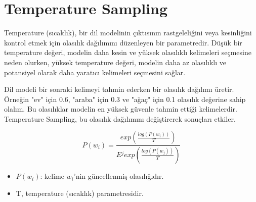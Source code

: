 \section{Temperature Sampling}

Temperature (sıcaklık), bir dil modelinin çıktısının rastgeleliğini veya kesinliğini kontrol etmek için olasılık dağılımını düzenleyen bir parametredir. Düşük bir temperature değeri, modelin daha kesin ve yüksek olasılıklı kelimeleri seçmesine neden olurken, yüksek temperature değeri, modelin daha az olasılıklı ve potansiyel olarak daha yaratıcı kelimeleri seçmesini sağlar. 

Dil modeli bir sonraki kelimeyi tahmin ederken bir olasılık dağılımı üretir. Örneğin "ev" için 0.6, "araba" için 0.3 ve "ağaç" için 0.1 olasılık değerine sahip olalım. Bu olasılıklar modelin en yüksek güvenle tahmin ettiği kelimelerdir. Temperature Sampling, bu olasılık dağılımını değiştirerek sonuçları etkiler.

\[ P(w_i) = \frac{exp(\frac{log(P(w_i))}{T})}{E{}^{j} exp(\frac{log(P(w_j))}{T})} \]

\begin{itemize}
    \item $P(w_i)$: kelime $w_i$'nin güncellenmiş olasılığıdır.
    \item T, temperature (sıcaklık) parametresidir.
\end{itemize}

\newpage